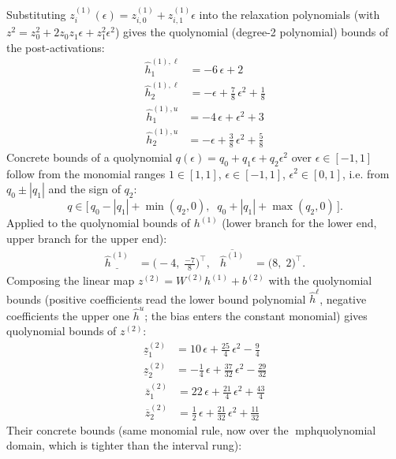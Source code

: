 \documentclass[11pt]{article}
\begin{document}
Substituting $z^{(1)}_i(\epsilon) = z^{(1)}_{i,0} + z^{(1)}_{i,1} \epsilon$ into the relaxation
polynomials (with $z^2 = z_0^2 + 2 z_0 z_1 \epsilon + z_1^2 \epsilon^2$) gives the quolynomial
(degree-2 polynomial) bounds of the post-activations:
\begin{align*}
\hat{h}^{(1),\ell}_{1} &= -6\,\epsilon + 2 \\
\hat{h}^{(1),\ell}_{2} &= -\epsilon + \frac{7}{8}\,\epsilon^2 + \frac{1}{8}
\end{align*}
\begin{align*}
\hat{h}^{(1),u}_{1} &= -4\,\epsilon + \epsilon^2 + 3 \\
\hat{h}^{(1),u}_{2} &= -\epsilon + \frac{3}{8}\,\epsilon^2 + \frac{5}{8}
\end{align*}
Concrete bounds of a quolynomial $q(\epsilon) = q_0 + q_1 \epsilon + q_2 \epsilon^2$ over
$\epsilon \in [-1, 1]$ follow from the monomial ranges $1 \in [1, 1]$, $\epsilon \in [-1, 1]$,
$\epsilon^2 \in [0, 1]$, i.e. from $q_0 \pm |q_1|$ and the sign of $q_2$:
\begin{equation*}
q \in \bigl[\, q_0 - |q_1| + \min(q_2, 0), \;\; q_0 + |q_1| + \max(q_2, 0) \,\bigr].
\end{equation*}
Applied to the quolynomial bounds of $h^{(1)}$ (lower branch for the lower end, upper branch for the upper end):
\begin{align*}
\underline{\hat{h}^{(1)}} &= \bigl(-4,\; \frac{-7}{8}\bigr)^{\!\top}, & \overline{\hat{h}^{(1)}} &= \bigl(8,\; 2\bigr)^{\!\top}.
\end{align*}
Composing the linear map $z^{(2)} = W^{(2)} h^{(1)} + b^{(2)}$ with the quolynomial bounds
(positive coefficients read the lower bound polynomial $\hat{h}^{\ell}$, negative coefficients the
upper one $\hat{h}^{u}$; the bias enters the constant monomial) gives quolynomial bounds of
$z^{(2)}$:
\begin{align*}
\underline{z}^{(2)}_{1} &= 10\,\epsilon + \frac{25}{4}\,\epsilon^2 - \frac{9}{4} \\
\underline{z}^{(2)}_{2} &= -\frac{1}{4}\,\epsilon + \frac{37}{32}\,\epsilon^2 - \frac{29}{32}
\end{align*}
\begin{align*}
\overline{z}^{(2)}_{1} &= 22\,\epsilon + \frac{21}{4}\,\epsilon^2 + \frac{43}{4} \\
\overline{z}^{(2)}_{2} &= \frac{1}{2}\,\epsilon + \frac{21}{32}\,\epsilon^2 + \frac{11}{32}
\end{align*}
Their concrete bounds (same monomial rule, now over the mph{quolynomial} domain, which is tighter than the interval rung):
\end{document}
